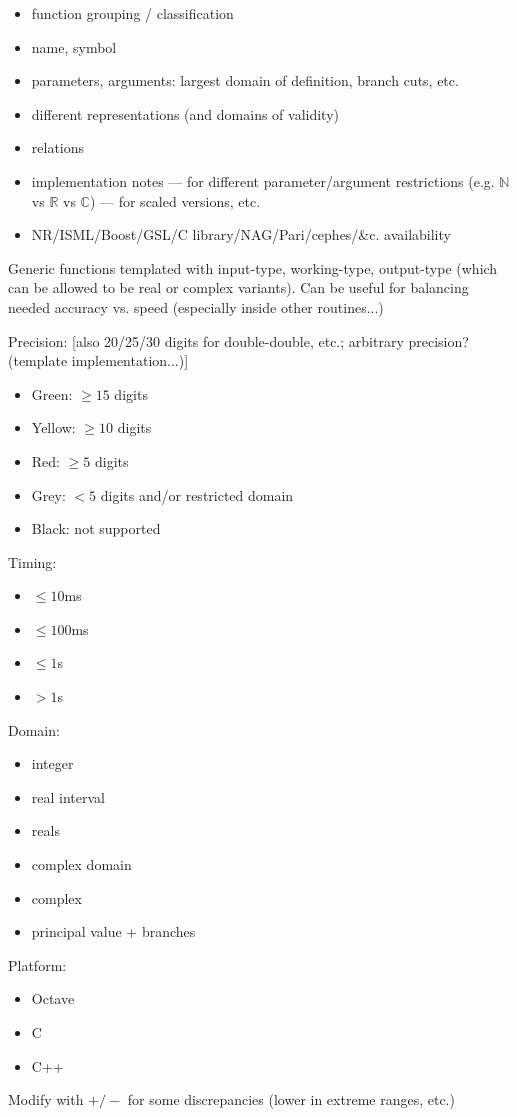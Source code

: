 \documentclass[10pt,dvipdfmx,letterpaper,twoside]{article}
\newcommand{\RR}{{\mathbb{R}}}
\newcommand{\CC}{{\mathbb{C}}}
\newcommand{\NN}{{\mathbb{N}}}
\begin{document}
\begin{itemize}
\item function grouping / classification
\item name, symbol
\item parameters, arguments: largest domain of definition, branch cuts, etc.
\item different representations (and domains of validity)
\item relations
\item implementation notes
  --- for different parameter/argument restrictions (e.g. $\NN$ vs $\RR$ vs $\CC$)
  --- for scaled versions, etc.
\item NR/ISML/Boost/GSL/C library/NAG/Pari/cephes/\&c. availability
\end{itemize}

Generic functions templated with input-type, working-type, output-type
(which can be allowed to be real or complex variants).  Can be useful for balancing
needed accuracy vs. speed (especially inside other routines...)

Precision: [also 20/25/30 digits for double-double, etc.; arbitrary precision? (template implementation...)]
\begin{itemize}
\item Green: $\ge15$ digits
\item Yellow: $\ge10$ digits
\item Red: $\geq5$ digits
\item Grey: $<5$ digits and/or restricted domain
\item Black: not supported
\end{itemize}
Timing: 
\begin{itemize}
\item $\leq10$ms
\item $\leq100$ms
\item $\leq1$s
\item $>1$s
\end{itemize}
Domain: 
\begin{itemize}
\item integer
\item real interval
\item reals
\item complex domain
\item complex
\item principal value + branches
\end{itemize}
Platform: 
\begin{itemize}
\item Octave
\item C
\item C++
\end{itemize}
Modify with $+/-$ for some discrepancies (lower in extreme ranges, etc.)
\end{document}
